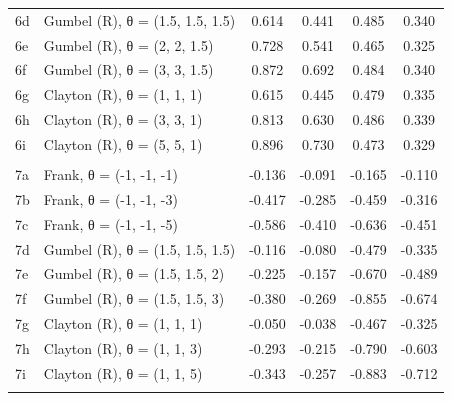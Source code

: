 \documentclass[
]{article}
\begin{document}
\begin{longtable}[t]{llcccc}
\hspace{1em}6d & Gumbel (R), θ = (1.5, 1.5, 1.5) & 0.614 & 0.441 & 0.485 & 0.340\\
\hspace{1em}6e & Gumbel (R), θ = (2, 2, 1.5) & 0.728 & 0.541 & 0.465 & 0.325\\
\hspace{1em}6f & Gumbel (R), θ = (3, 3, 1.5) & 0.872 & 0.692 & 0.484 & 0.340\\
\hspace{1em}6g & Clayton (R), θ = (1, 1, 1) & 0.615 & 0.445 & 0.479 & 0.335\\
\hspace{1em}6h & Clayton (R), θ = (3, 3, 1) & 0.813 & 0.630 & 0.486 & 0.339\\
\hspace{1em}6i & Clayton (R), θ = (5, 5, 1) & 0.896 & 0.730 & 0.473 & 0.329\\
\addlinespace[0.3em]
\multicolumn{6}{l}{\textbf{Scenario 7: (-, -, -)}}\\
\hspace{1em}7a & Frank, θ = (-1, -1, -1) & -0.136 & -0.091 & -0.165 & -0.110\\
\hspace{1em}7b & Frank, θ = (-1, -1, -3) & -0.417 & -0.285 & -0.459 & -0.316\\
\hspace{1em}7c & Frank, θ = (-1, -1, -5) & -0.586 & -0.410 & -0.636 & -0.451\\
\hspace{1em}7d & Gumbel (R), θ = (1.5, 1.5, 1.5) & -0.116 & -0.080 & -0.479 & -0.335\\
\hspace{1em}7e & Gumbel (R), θ = (1.5, 1.5, 2) & -0.225 & -0.157 & -0.670 & -0.489\\
\hspace{1em}7f & Gumbel (R), θ = (1.5, 1.5, 3) & -0.380 & -0.269 & -0.855 & -0.674\\
\hspace{1em}7g & Clayton (R), θ = (1, 1, 1) & -0.050 & -0.038 & -0.467 & -0.325\\
\hspace{1em}7h & Clayton (R), θ = (1, 1, 3) & -0.293 & -0.215 & -0.790 & -0.603\\
\hspace{1em}7i & Clayton (R), θ = (1, 1, 5) & -0.343 & -0.257 & -0.883 & -0.712\\
\addlinespace[0.3em]
\multicolumn{6}{l}{\textbf{Scenario 8: (+, -, +)}}\\

\end{longtable}
\end{document}
